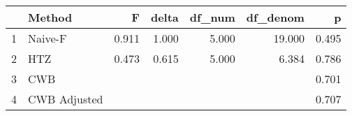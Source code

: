 \begin{table}[ht]
\centering
\begin{tabular}{rlrrrrr}
  \hline
 & Method & F & delta & df\_num & df\_denom & p \\ 
  \hline
1 & Naive-F & 0.911 & 1.000 & 5.000 & 19.000 & 0.495 \\ 
  2 & HTZ & 0.473 & 0.615 & 5.000 & 6.384 & 0.786 \\ 
  3 & CWB &  &  &  &  & 0.701 \\ 
  4 & CWB Adjusted &  &  &  &  & 0.707 \\ 
   \hline
\end{tabular}
\end{table}
